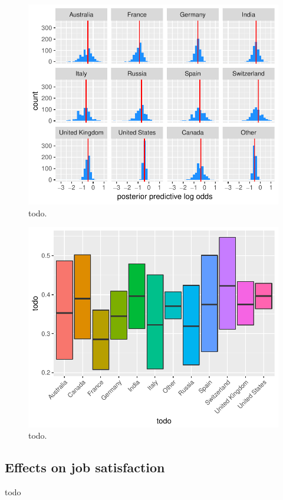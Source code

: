 \documentclass{article}
\begin{document}
\begin{figure}[H]
\centering
\includegraphics{report-010}
\caption{todo.}\label{fig_1}
\end{figure}


\begin{figure}[H]
\centering
\includegraphics{report-012}
\caption{todo.}\label{fig_2}
\end{figure}

\subsection{Effects on job satisfaction}
todo
\end{document}
